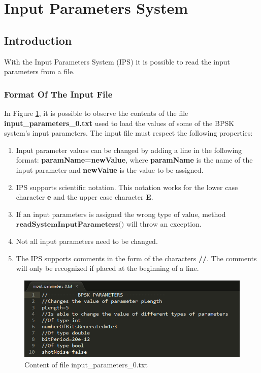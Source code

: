 \section{Input Parameters System}
\subsection{Introduction}
With the Input Parameters System (IPS) it is possible to read the input parameters from a file.

\subsubsection{Format Of The Input File}
In Figure \ref{fig:ipsfilecontent}, it is possible to observe the contents of the file \textbf{input\_parameters\_0.txt} used to load the values of some of the BPSK system's input parameters. The input file must respect the following properties:
\begin{enumerate}
\item Input parameter values can be changed by adding a line in the following format: \textbf{paramName=newValue}, where \textbf{paramName} is the name of the input parameter and \textbf{newValue} is the value to be assigned.
\item IPS supports scientific notation. This notation works for the lower case character \textbf{e} and the upper case character \textbf{E}.
\item If an input parameters is assigned the wrong type of value, method $\textbf{readSystemInputParameters()}$ will throw an exception.
\item Not all input parameters need to be changed.
\item The IPS supports comments in the form of the characters \textbf{//}. The comments will only be recognized if placed at the beginning of a line.
\end{enumerate}

\begin{figure}[H]
\centering
\includegraphics[width=0.8\linewidth]{./chapter/simulator_structure/figures/ips_input_file}
\caption{Content of file input\_parameters\_0.txt}
\label{fig:ipsfilecontent}
\end{figure}
\pagebreak

